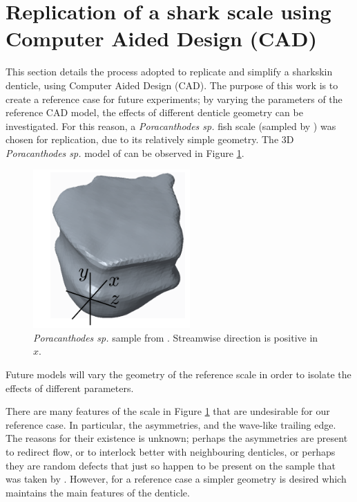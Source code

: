 \documentclass[12pt,oneside,a4paper]{article}
\begin{document}
\section{Replication of a shark scale using Computer Aided Design (CAD)}
\label{section:cad}
This section details the process adopted to replicate and simplify a sharkskin denticle, using Computer Aided Design (CAD). The purpose of this work is to create a reference case for future experiments; by varying the parameters of the reference CAD model, the effects of different denticle geometry can be investigated. For this reason, a \textit{Poracanthodes sp.} fish scale (sampled by \cite{fletcher2014phd}) was chosen for replication, due to its relatively simple geometry. The 3D \textit{Poracanthodes sp.} model of \cite{fletcher2014phd} can be observed in Figure \ref{figure:cad:scaleSample}.  
%
\begin{figure}[!b]
\centering
\includegraphics[width=6cm]{images/cad/scannedScaleFletcher.png}\hfill
\caption{\textit{Poracanthodes sp.} sample from \cite{fletcher2014phd}. Streamwise direction is positive in $x$.}
\label{figure:cad:scaleSample}
\end{figure}
%
 Future models will vary the geometry of the reference scale in order to isolate the effects of different parameters. 

There are many features of the scale in Figure \ref{figure:cad:scaleSample} that are undesirable for our reference case. In particular, the asymmetries, and the wave-like trailing edge. The reasons for their existence is unknown; perhaps the asymmetries are present to redirect flow, or to interlock better with neighbouring denticles, or perhaps they are random defects that just so happen to be present on the sample that was taken by \cite{fletcher2014phd}. However, for a reference case a simpler geometry is desired which maintains the main features of the denticle.
\end{document}
